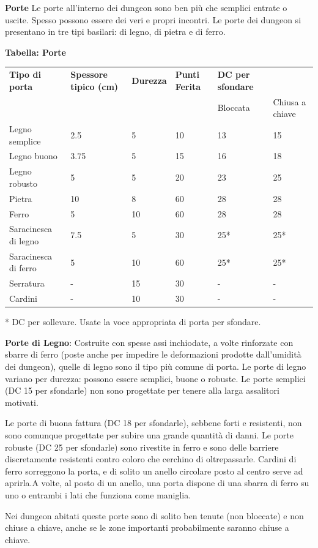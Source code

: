 \documentclass[a4paper,11pt,twoside,openany]{book}
\begin{document}
\textbf{Porte} Le porte all'interno dei dungeon sono ben più che semplici entrate o uscite. Spesso possono essere dei veri e propri incontri. Le porte dei dungeon si presentano in tre tipi basilari: di legno, di pietra e di ferro.

\bigskip

\textbf{Tabella: Porte}

\bigskip

\begin{tabularx}{\textwidth}{llllll}
	\toprule
	\textbf{Tipo di porta} & \textbf{Spessore tipico (cm)} & \textbf{Durezza} & \textbf{Punti Ferita} & \textbf{DC per sfondare} \tabularnewline
    &&   &   & Bloccata  & Chiusa a chiave\tabularnewline
	Legno semplice    & 2.5  & 5 & 10& 13   & 15\tabularnewline
	Legno buono  & 3.75 & 5 & 15& 16   & 18\tabularnewline
	Legno robusto& 5    & 5 & 20& 23   & 25\tabularnewline
	Pietra  & 10   & 8 & 60& 28   & 28\tabularnewline
	Ferro   & 5    & 10& 60& 28   & 28\tabularnewline
	Saracinesca di legno   & 7.5  & 5 & 30& 25{*}& 25{*}\tabularnewline
	Saracinesca di ferro   & 5    & 10& 60& 25{*}& 25{*}\tabularnewline
	Serratura    & -    & 15& 30& -    & -\tabularnewline
	Cardini & -    & 10& 30& -    & -\tabularnewline
\end{tabularx}

{*} DC per sollevare. Usate la voce appropriata di porta per sfondare.

\bigskip

\textbf{Porte di Legno}: Costruite con spesse assi inchiodate, a volte rinforzate con sbarre di ferro (poste anche per impedire le deformazioni prodotte dall'umidità dei dungeon), quelle di legno sono il tipo più comune di porta. Le porte di legno variano per durezza: possono essere semplici, buone o robuste. Le porte semplici (DC 15 per sfondarle) non sono progettate per tenere alla larga assalitori motivati.

Le porte di buona fattura (DC 18 per sfondarle), sebbene forti e resistenti, non sono comunque progettate per subire una grande quantità di danni. Le porte robuste (DC 25 per sfondarle) sono rivestite in ferro e sono delle barriere discretamente resistenti contro coloro che cerchino di oltrepassarle. Cardini di ferro sorreggono la porta, e di solito un anello circolare posto al centro serve ad aprirla.A volte, al posto di un anello, una porta dispone di una sbarra di ferro su uno o entrambi i lati che funziona come maniglia.

Nei dungeon abitati queste porte sono di solito ben tenute (non bloccate) e non chiuse a chiave, anche se le zone importanti probabilmente saranno chiuse a chiave.
\end{document}
